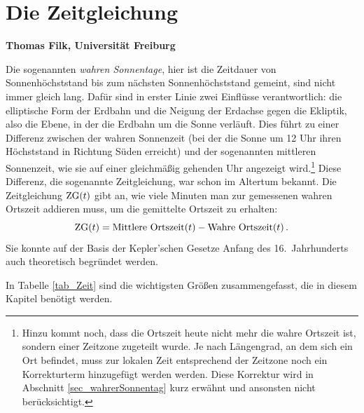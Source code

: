 
\setcounter{page}{1}
\setcounter{section}{0}
\setcounter{figure}{0}
\setcounter{equation}{0}
\setcounter{table}{0}
\setcounter{footnote}{0}

\section*{Die Zeitgleichung}
\vspace{0.2cm}
\noindent
{\bf Thomas Filk, Universit\"at Freiburg}
\vspace{1cm}

\label{chap_Zeitgleichung}
\noindent
Die sogenannten \textit{wahren Sonnentage}, 
hier ist die Zeitdauer von Sonnenh\"ochststand bis zum n\"achsten Sonnenh\"ochststand
gemeint, sind nicht immer gleich lang. Daf\"ur sind in erster Linie zwei Einfl\"usse verantwortlich:
die elliptische Form der Erdbahn und die Neigung der Erdachse gegen die 
Ekliptik, also die Ebene, in der die Erdbahn um die Sonne verl\"auft. Dies f\"uhrt zu einer 
Differenz zwischen der wahren Sonnenzeit 
(bei der die Sonne um 12 Uhr ihren H\"ochststand
in Richtung S\"uden erreicht) und der sogenannten mittleren Sonnenzeit, wie sie auf einer 
gleichm\"a\ss ig gehenden Uhr angezeigt wird.\footnote{Hinzu kommt noch, dass die Ortszeit heute
nicht mehr die wahre Ortszeit ist, sondern einer Zeitzone zugeteilt wurde. Je nach L\"angengrad, an
dem sich ein Ort befindet, muss zur lokalen Zeit entsprechend der Zeitzone noch ein Korrekturterm
hinzugef\"ugt werden werden. Diese Korrektur wird in Abschnitt \ref{sec_wahrerSonnentag} kurz 
erw\"ahnt und ansonsten nicht ber\"ucksichtigt.}
Diese Differenz, die sogenannte Zeitgleichung, 
war schon im Altertum bekannt. Die Zeitgleichung ${\rm ZG}(t)$ gibt an, wie viele Minuten man zur gemessenen 
wahren Ortszeit addieren muss, um die gemittelte Ortszeit zu erhalten:
\begin{equation}
       {\rm ZG}(t) = \mbox{Mittlere Ortszeit}(t) - \mbox{Wahre Ortszeit}(t) \, .
\end{equation}
Sie konnte auf der Basis der Kepler'schen Gesetze Anfang des 16.\ Jahrhunderts auch theoretisch
begr\"undet werden. 

In Tabelle \ref{tab_Zeit} sind die wichtigsten Gr\"o\ss en zusammengefasst, die in diesem
Kapitel ben\"otigt werden.%

